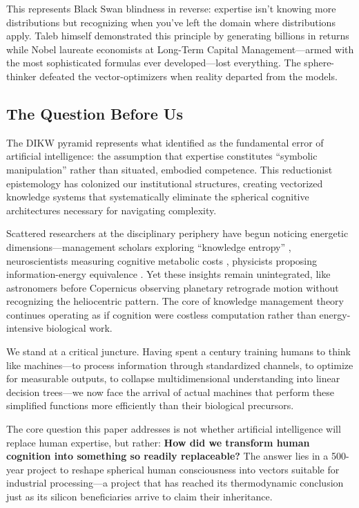 This represents \citet{taleb2007} Black Swan blindness in reverse: expertise isn't knowing more distributions but recognizing when you've left the domain where distributions apply. Taleb himself demonstrated this principle by generating billions in returns while Nobel laureate economists at Long-Term Capital Management---armed with the most sophisticated formulas ever developed---lost everything. The sphere-thinker defeated the vector-optimizers when reality departed from the models.

\subsection{The Question Before Us}

The DIKW pyramid represents what \citet{dreyfus1979} identified as the fundamental error of artificial intelligence: the assumption that expertise constitutes ``symbolic manipulation'' rather than situated, embodied competence. This reductionist epistemology has colonized our institutional structures, creating vectorized knowledge systems that systematically eliminate the spherical cognitive architectures necessary for navigating complexity.

Scattered researchers at the disciplinary periphery have begun noticing energetic dimensions---management scholars exploring ``knowledge entropy'' \citep{bratianu2020}, neuroscientists measuring cognitive metabolic costs \citep{wiehler2022}, physicists proposing information-energy equivalence \citep{stonier1996}. Yet these insights remain unintegrated, like astronomers before Copernicus observing planetary retrograde motion without recognizing the heliocentric pattern. The core of knowledge management theory continues operating as if cognition were costless computation rather than energy-intensive biological work.

We stand at a critical juncture. Having spent a century training humans to think like machines---to process information through standardized channels, to optimize for measurable outputs, to collapse multidimensional understanding into linear decision trees---we now face the arrival of actual machines that perform these simplified functions more efficiently than their biological precursors.

The core question this paper addresses is not whether artificial intelligence will replace human expertise, but rather: \textbf{How did we transform human cognition into something so readily replaceable?} The answer lies in a 500-year project to reshape spherical human consciousness into vectors suitable for industrial processing---a project that has reached its thermodynamic conclusion just as its silicon beneficiaries arrive to claim their inheritance.


